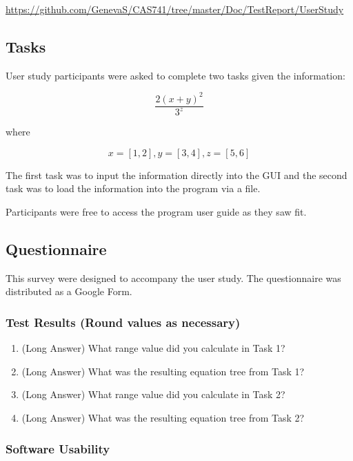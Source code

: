 \documentclass[12pt, titlepage]{article}
\begin{document}
\begin{center}
	\href{https://github.com/GenevaS/CAS741/tree/master/Doc/TestReport/UserStudy}{https://github.com/GenevaS/CAS741/tree/master/Doc/TestReport/UserStudy}
\end{center}

\subsection{Tasks}
User study participants were asked to complete two tasks given the information: 

$$\frac{2(x + y)^2}{3^z}$$

where

$$x = [1, 2], y = [3, 4], z = [5, 6]$$

The first task was to input the information directly into the GUI and the 
second task was to load the information into the program via a file.

Participants were free to access the program user guide as they saw fit. 

\subsection{Questionnaire}
This survey were designed to accompany the user study. The questionnaire was 
distributed as a Google Form.

\subsubsection{Test Results (Round values as necessary)}
\begin{enumerate}
	\item (Long Answer) What range value did you calculate in Task 1?
	\item (Long Answer) What was the resulting equation tree from Task 1?
	\item (Long Answer) What range value did you calculate in Task 2?
	\item (Long Answer) What was the resulting equation tree from Task 2?
\end{enumerate}

\subsubsection{Software Usability}
\end{document}
